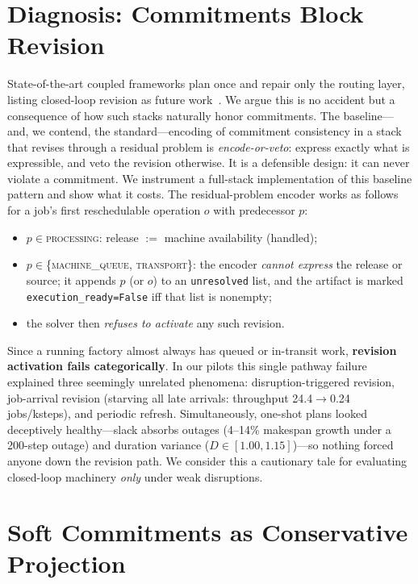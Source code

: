 \documentclass[twocolumn]{article}
\begin{document}
\section{Diagnosis: Commitments Block Revision}
\label{sec:diagnosis}
State-of-the-art coupled frameworks plan once and repair only the
routing layer, listing closed-loop revision as future
work~\cite{li2026framework}. We argue this is no accident but a
consequence of how such stacks naturally honor commitments. The
baseline---and, we contend, the standard---encoding of commitment
consistency in a stack that revises through a residual problem is
\emph{encode-or-veto}: express exactly what is expressible, and veto
the revision otherwise. It is a defensible design: it can never violate
a commitment. We instrument a full-stack implementation of this
baseline pattern and show what it costs. The residual-problem encoder
works as follows for a job's first reschedulable operation $o$ with
predecessor $p$:
\begin{itemize}
\item $p\in$\textsc{processing}: release $:=$ machine availability
(handled);
\item $p\in$\{\textsc{machine\_queue}, \textsc{transport}\}: the encoder
\emph{cannot express} the release or source; it appends $p$ (or $o$) to
an \texttt{unresolved} list, and the artifact is marked
\texttt{execution\_ready=False} iff that list is nonempty;
\item the solver then \emph{refuses to activate} any such revision.
\end{itemize}

Since a running factory almost always has queued or in-transit work,
\textbf{revision activation fails categorically}. In our pilots this
single pathway failure explained three seemingly unrelated phenomena:
disruption-triggered revision, job-arrival revision (starving all late
arrivals: throughput 24.4$\to$0.24 jobs/ksteps), and periodic refresh.
Simultaneously, one-shot plans looked deceptively healthy---slack absorbs
outages (4--14\% makespan growth under a 200-step outage) and duration
variance ($D\in[1.00,1.15]$)---so nothing forced anyone down the
revision path. We consider this a cautionary tale for evaluating
closed-loop machinery \emph{only} under weak disruptions.

\section{Soft Commitments as Conservative Projection}
\label{sec:soft}
\end{document}
